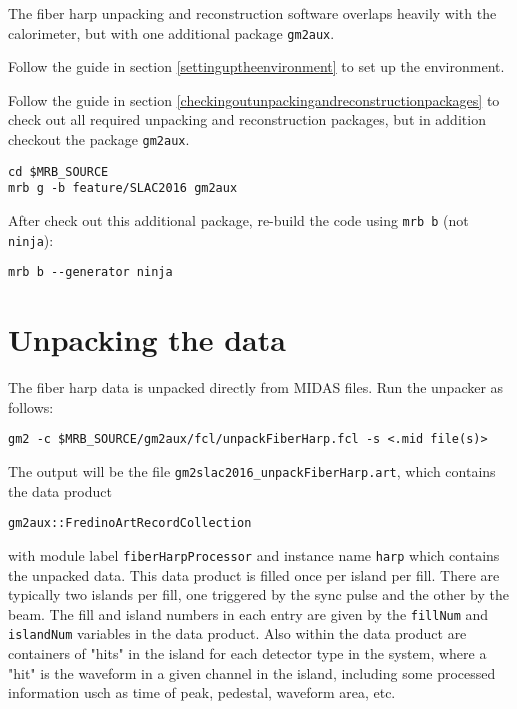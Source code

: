 The fiber harp unpacking and reconstruction software overlaps heavily with the calorimeter, but with one additional package \verb+gm2aux+.

\vspace{4mm}\par\noindent  Follow the guide in section \ref{settinguptheenvironment} to set up the environment.

\vspace{4mm}\par\noindent  Follow the guide in section \ref{checkingoutunpackingandreconstructionpackages} to check out all required unpacking and reconstruction packages, but in addition checkout the package \verb+gm2aux+.
%
\begin{Verbatim}[frame=single]
cd $MRB_SOURCE
mrb g -b feature/SLAC2016 gm2aux
\end{Verbatim}
%

\noindent After check out this additional package, re-build the code using \verb+mrb b+ (not \verb+ninja+):

%
\begin{Verbatim}[frame=single]
mrb b --generator ninja
\end{Verbatim}
%

\section{Unpacking the data}

The fiber harp data is unpacked directly from MIDAS files. Run the unpacker as follows:
%
\begin{Verbatim}[frame=single]
gm2 -c $MRB_SOURCE/gm2aux/fcl/unpackFiberHarp.fcl -s <.mid file(s)>
\end{Verbatim}
%

The output will be the file \verb+gm2slac2016_unpackFiberHarp.art+, which contains the data product
%
\begin{Verbatim}[frame=single]
gm2aux::FredinoArtRecordCollection
\end{Verbatim}
%
with module label \verb+fiberHarpProcessor+ and instance name \verb+harp+ which contains the unpacked data. This data product is filled once per island per fill. There are typically two islands per fill, one triggered by the sync pulse and the other by the beam. The fill and island numbers in each entry are given by the \verb+fillNum+ and \verb+islandNum+ variables in the data product.
Also within the data product are containers of "hits" in the island for each detector type in the system, where a "hit" is the waveform in a given channel in the island, including some processed information usch as time of peak, pedestal, waveform area, etc.

